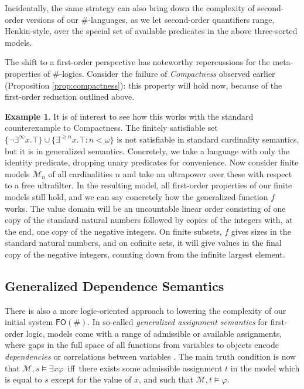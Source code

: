 \documentclass[12pt,oneside,reqno]{amsart}
\theoremstyle{definition}
\newtheorem{example}{Example}
\begin{document}


Incidentally, the same strategy can also  bring down the complexity of  second-order versions of our $\#$-languages, as we let second-order quantifiers range, Henkin-style, over the special set of available predicates in the above three-sorted models.

The shift to a first-order perspective  has noteworthy repercussions for the meta-properties of $\#$-logics. Consider the failure of \emph{Compactness} observed earlier (Proposition \ref{prop:compactness}): this property will hold now, because of the first-order reduction outlined above. 

\begin{example} It is of interest to see how this works with the standard counterexample to Compactness. The finitely satisfiable set $\{\neg \exists^\infty x. \top\} \cup \{ \exists^{\geq n}x.\top: n < \omega \}$  %
is not satisfiable in  standard cardinality semantics, but it is  in generalized semantics. Concretely, we take a language with only the identity predicate, dropping unary predicates for convenience. Now consider finite models $\mathcal{M}_n$ of all cardinalities $n$ and take an ultrapower over these with respect to a free ultrafilter. In the resulting model, all first-order properties of our finite models still hold, and we can say concretely how the generalized function $f$ works. The value domain will be an uncountable linear order consisting of one copy of the standard natural numbers followed by copies of the integers with, at the end, one copy of the negative integers. On finite subsets, $f$ gives sizes in the standard natural numbers, and on cofinite sets, it will give values in the final copy of the negative integers, counting down from the infinite largest element.  \end{example}

\subsection{Generalized Dependence  Semantics} There is also a more logic-oriented approach to lowering the complexity of our initial system $\mathsf{FO}(\#)$. In so-called \emph{generalized assignment semantics} for first-order logic, models come with a range of admissible or available assignments, where gaps in the full space of all functions from variables to objects encode \emph{dependencies} or correlations between variables \citep{Nemeti,BaltagvanBenthem}. The main truth condition is now that $\mathcal{M}, s \models \exists x \varphi$\, iff \,there exists some admissible assignment $t$ in the model which is equal to $s$ except for the value of $x$, and  such that    $\mathcal{M}, t \models  \varphi$.
\end{document}
